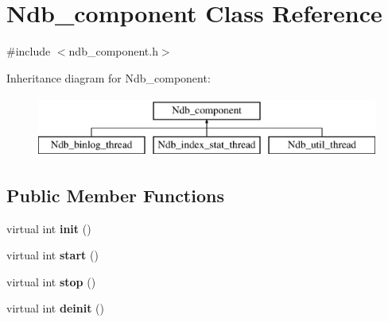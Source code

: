 \hypertarget{classNdb__component}{}\section{Ndb\+\_\+component Class Reference}
\label{classNdb__component}


{\ttfamily \#include $<$ndb\+\_\+component.\+h$>$}

Inheritance diagram for Ndb\+\_\+component\+:\begin{figure}[H]
\begin{center}
\leavevmode
\includegraphics[height=2.000000cm]{classNdb__component}
\end{center}
\end{figure}
\subsection*{Public Member Functions}
\begin{DoxyCompactItemize}
\item 
\mbox{\label{classNdb__component_aaf4024753fb4282668f80f531243a389}} 
virtual int {\bfseries init} ()
\item 
\mbox{\label{classNdb__component_ae72c69a9eec16a14e954cd01ccd45802}} 
virtual int {\bfseries start} ()
\item 
\mbox{\label{classNdb__component_a407e260a3c2088fd1f5dbc6f2f0c5216}} 
virtual int {\bfseries stop} ()
\item 
\mbox{\label{classNdb__component_afebd4dc208d9be7416c9e5a01f91688d}} 
virtual int {\bfseries deinit} ()
\end{DoxyCompactItemize}
